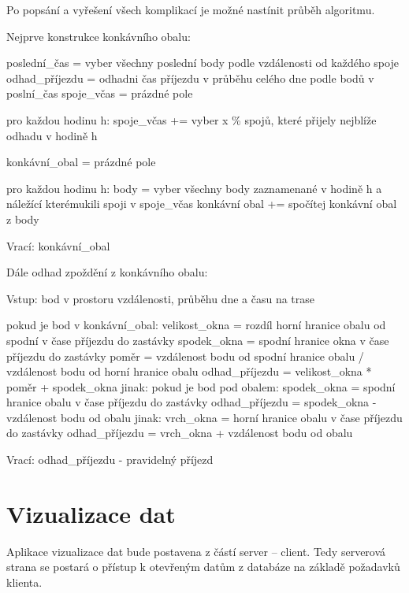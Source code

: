 Po popsání a vyřešení všech komplikací je možné nastínit průběh algoritmu.

\bigbreak

Nejprve konstrukce konkávního obalu:

\begin{code}[frame=none]
poslední_čas = vyber všechny poslední body podle vzdálenosti od každého spoje
odhad_příjezdu = odhadni čas příjezdu v průběhu celého dne podle bodů v poslní_čas
spoje_včas = prázdné pole

pro každou hodinu h:
    spoje_včas += vyber x \% spojů, které přijely nejblíže odhadu v hodině h

konkávní_obal = prázdné pole

pro každou hodinu h:
    body = vyber všechny body zaznamenané v hodině h a náležící kterémukili spoji v spoje_včas
    konkávní obal += spočítej konkávní obal z body

Vrací: konkávní_obal
\end{code}

Dále odhad zpoždění z konkávního obalu:

\begin{code}[frame=none]
Vstup: bod v prostoru vzdálenosti, průběhu dne a času na trase

pokud je bod v konkávní_obal:
    velikost_okna = rozdíl horní hranice obalu od spodní v čase příjezdu do zastávky
    spodek_okna = spodní hranice okna v čase příjezdu do zastávky
    poměr = vzdálenost bodu od spodní hranice obalu / vzdálenost bodu od horní hranice obalu
    odhad_příjezdu = velikost_okna * poměr + spodek_okna
jinak:
    pokud je bod pod obalem:
        spodek_okna = spodní hranice obalu v čase příjezdu do zastávky
        odhad_příjezdu = spodek_okna - vzdálenost bodu od obalu
    jinak:
        vrch_okna = horní hranice obalu v čase příjezdu do zastávky
        odhad_příjezdu = vrch_okna + vzdálenost bodu od obalu

Vrací: odhad_příjezdu - pravidelný příjezd
\end{code}








\section{Vizualizace dat}

 Aplikace vizualizace dat bude postavena z částí server -- client. Tedy serverová strana se postará o přístup k otevřeným datům z databáze na základě požadavků klienta.

